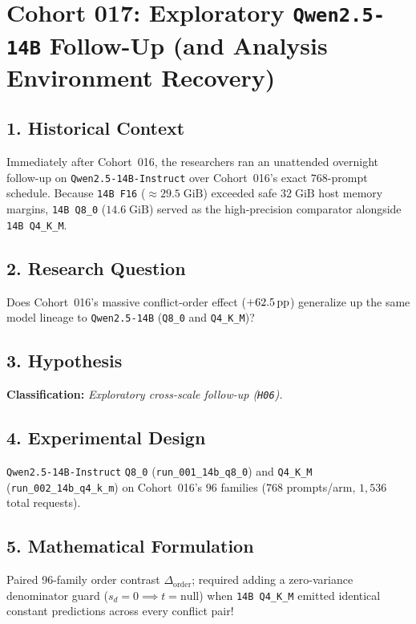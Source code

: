 \section{Cohort 017: Exploratory \texttt{Qwen2.5-14B} Follow-Up (and Analysis Environment Recovery)}

\subsection*{1. Historical Context}
Immediately after Cohort~016, the researchers ran an unattended overnight follow-up on \texttt{Qwen2.5-14B-Instruct} over Cohort~016's exact $768$-prompt schedule. Because \texttt{14B F16} ($\approx 29.5\;\text{GiB}$) exceeded safe $32\;\text{GiB}$ host memory margins, \texttt{14B Q8\_0} ($14.6\;\text{GiB}$) served as the high-precision comparator alongside \texttt{14B Q4\_K\_M}.

\subsection*{2. Research Question}
Does Cohort~016's massive conflict-order effect ($+62.5\,\mathrm{pp}$) generalize up the same model lineage to \texttt{Qwen2.5-14B} (\texttt{Q8\_0} and \texttt{Q4\_K\_M})?

\subsection*{3. Hypothesis}
\textbf{Classification:} \emph{Exploratory cross-scale follow-up (\texttt{H06}).}

\subsection*{4. Experimental Design}
\texttt{Qwen2.5-14B-Instruct} \texttt{Q8\_0} (\texttt{run\_001\_14b\_q8\_0}) and \texttt{Q4\_K\_M} (\texttt{run\_002\_14b\_q4\_k\_m}) on Cohort~016's $96$ families ($768$ prompts/arm, $1{,}536$ total requests).

\subsection*{5. Mathematical Formulation}
Paired 96-family order contrast $\Delta_{\mathrm{order}}$; required adding a zero-variance denominator guard ($s_d = 0 \implies t = \text{null}$) when \texttt{14B Q4\_K\_M} emitted identical constant predictions across every conflict pair!

